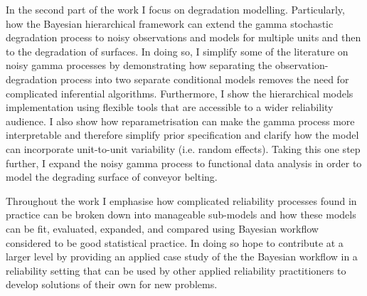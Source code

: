 In the second part of the work I focus on degradation modelling. Particularly, how the Bayesian hierarchical framework can extend the gamma stochastic degradation process to noisy observations and models for multiple units and then to the degradation of surfaces. In doing so, I simplify some of the literature on noisy gamma processes by demonstrating how separating the observation-degradation process into two separate conditional models removes the need for complicated inferential algorithms. Furthermore, I show the hierarchical models implementation using flexible tools that are accessible to a wider reliability audience. I also show how reparametrisation can make the gamma process more interpretable and therefore simplify prior specification and clarify how the model can incorporate unit-to-unit variability (i.e. random effects). Taking this one step further, I expand the noisy gamma process to functional data analysis in order to model the degrading surface of conveyor belting.

Throughout the work I emphasise how complicated reliability processes found in practice can be broken down into manageable sub-models and how these models can be fit, evaluated, expanded, and compared using Bayesian workflow considered to be good statistical practice. In doing so hope to contribute at a larger level by providing an applied case study of the the Bayesian workflow in a reliability setting that can be used by other applied reliability practitioners to develop solutions of their own for new problems.

\vspace*{\fill}